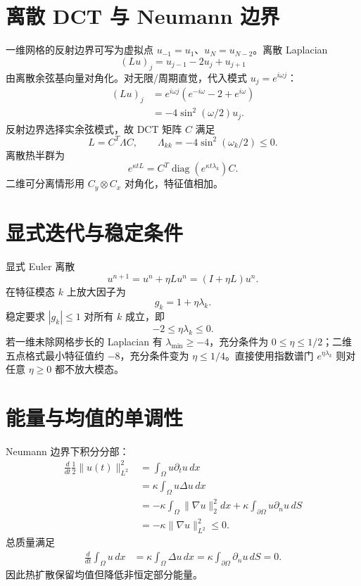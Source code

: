 \documentclass[11pt]{article}
\numberwithin{equation}{section}
\newcommand{\1}{\mathbf{1}}
\newcommand{\diag}{\operatorname{diag}}
\begin{document}
\section{离散 DCT 与 Neumann 边界}

一维网格的反射边界可写为虚拟点
$u_{-1}=u_1$、$u_N=u_{N-2}$。离散 Laplacian
\begin{equation}
 (Lu)_j=u_{j-1}-2u_j+u_{j+1}
\end{equation}
由离散余弦基向量对角化。对无限/周期直觉，代入模式
$u_j=e^{i\omega j}$：
\begin{align}
 (Lu)_j
 &=e^{i\omega j}(e^{-i\omega}-2+e^{i\omega})\\
 &=-4\sin^2(\omega/2)u_j.
\end{align}
反射边界选择实余弦模式，故 DCT 矩阵 $C$ 满足
\begin{equation}
 L=C^T\Lambda C,\qquad
 \Lambda_{kk}=-4\sin^2(\omega_k/2)\le0.
\end{equation}
离散热半群为
\begin{equation}
 e^{\kappa tL}=C^T\diag(e^{\kappa t\lambda_k})C.
\end{equation}
二维可分离情形用 $C_y\otimes C_x$ 对角化，特征值相加。

\section{显式迭代与稳定条件}

显式 Euler 离散
\begin{equation}
 u^{n+1}=u^n+\eta Lu^n=(I+\eta L)u^n.
\end{equation}
在特征模态 $k$ 上放大因子为
\begin{equation}
 g_k=1+\eta\lambda_k.
\end{equation}
稳定要求 $|g_k|\le1$ 对所有 $k$ 成立，即
\begin{equation}
 -2\le\eta\lambda_k\le0.
\end{equation}
若一维未除网格步长的 Laplacian 有 $\lambda_{\min}\ge-4$，充分条件为
$0\le\eta\le1/2$；二维五点格式最小特征值约 $-8$，充分条件变为
$\eta\le1/4$。直接使用指数谱门
$e^{\eta\lambda_k}$ 则对任意 $\eta\ge0$ 都不放大模态。

\section{能量与均值的单调性}

Neumann 边界下积分分部：
\begin{align}
 \frac d{dt}\frac12\|u(t)\|_{L^2}^2
 &=\int_\Omega u\partial_tu\,dx\\
 &=\kappa\int_\Omega u\Delta u\,dx\\
 &=-\kappa\int_\Omega\|\nabla u\|_2^2dx
 +\kappa\int_{\partial\Omega}u\partial_nu\,dS\\
 &=-\kappa\|\nabla u\|_{L^2}^2\le0.
\end{align}
总质量满足
\begin{align}
 \frac d{dt}\int_\Omega u\,dx
 &=\kappa\int_\Omega\Delta u\,dx
 =\kappa\int_{\partial\Omega}\partial_nu\,dS=0.
\end{align}
因此热扩散保留均值但降低非恒定部分能量。
\end{document}
